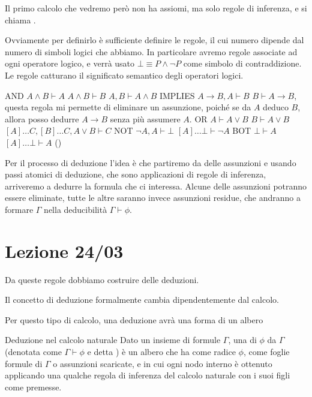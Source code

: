 Il primo calcolo che vedremo però non ha assiomi, ma solo regole di inferenza, e si chiama .

Ovviamente per definirlo è sufficiente definire le regole, il cui numero dipende dal numero di simboli logici che abbiamo. In particolare avremo regole associate ad ogni operatore logico, e verrà usato \(\bot \equiv P\land \neg P\) come simbolo di contraddizione. Le regole catturano il significato semantico degli operatori logici.


AND
\(A \land B \vdash A\) \(A \land B \vdash B\) \(A , B \vdash A\land B\)
IMPLIES
\(A \to B, A \vdash B\) \(B \vdash A \to B\), questa regola mi permette di eliminare un assunzione, poiché se da \(A\) deduco \(B\), allora posso dedurre \(A \to B\) senza più assumere \(A\).
OR
\(A \vdash A \lor B\) \(B \vdash A \lor B\) \([A]\ldots C ,[B]\ldots C, A \lor B \vdash C\) 
NOT
\(\neg A , A \vdash \bot\) \([A]\ldots \bot \vdash \neg A\)
BOT
\(\bot \vdash A\) \([A] \ldots \bot \vdash A\) (\RAA)

Per il processo di deduzione l'idea è che partiremo da delle assunzioni e usando passi atomici di deduzione, che sono applicazioni di regole di inferenza, arriveremo a dedurre la formula che ci interessa. Alcune delle assunzioni potranno essere eliminate, tutte le altre saranno invece assunzioni residue, che andranno a formare \(\Gamma\) nella deducibilità \(\Gamma \vdash \phi\).

\chapter{Lezione 24/03}

Da queste regole dobbiamo costruire delle deduzioni.

Il concetto di deduzione formalmente cambia dipendentemente dal calcolo.

Per questo tipo di calcolo, una deduzione avrà una forma di un albero

\begin{definition}{Deduzione nel calcolo naturale}
  Dato un insieme di formule \(\Gamma\), una  di \(\phi\) da \(\Gamma\) (denotata come \(\Gamma \vdash \phi\) e detta ) è un albero che ha come radice \(\phi\), come foglie formule di \(\Gamma\) o assunzioni scaricate, e in cui ogni nodo interno è ottenuto applicando una qualche regola di inferenza del calcolo naturale con i suoi figli come premesse.
\end{definition}


